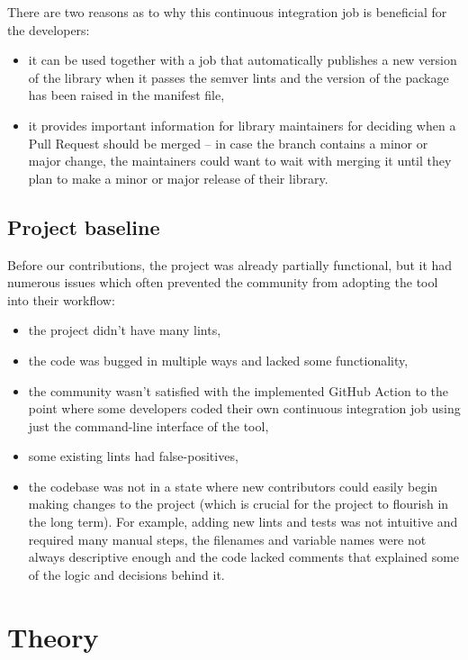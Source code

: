 \documentclass[licencjacka,en]{pracamgr}
\begin{document}
There are two reasons as to why this continuous integration job is beneficial for the developers:
\begin{itemize}
	\item it can be used together with a job that automatically publishes a new version of the
		library when it passes the semver lints and the version of the package has been raised
		in the manifest file,
	\item it provides important information for library maintainers for deciding when a Pull
		Request should be merged -- in case the branch contains a minor or major change, the
		maintainers could want to wait with merging it until they plan to make a minor or major
		release of their library.
\end{itemize}


\section{Project baseline}\label{r:section_project_baseline}

Before our contributions, the project was already partially functional, but it had numerous issues
which often prevented the community from adopting the tool into their workflow:
\begin{itemize}
	\item the project didn't have many lints,
	\item the code was bugged in multiple ways and lacked some functionality,
	\item the community wasn't satisfied with the implemented GitHub Action to the point where some
		developers coded their own continuous integration job using just the command-line interface
		of the tool,
	\item some existing lints had false-positives,
	\item the codebase was not in a state where new contributors could easily begin making changes
		to the project (which is crucial for the project to flourish in the long term).
		For example, adding new lints and tests was not intuitive and required many manual steps,
		the filenames and variable names were not always descriptive enough and the code lacked
		comments that explained some of the logic and decisions behind it.
\end{itemize}


\chapter{Theory}\label{r:chapter_theory}
\end{document}
